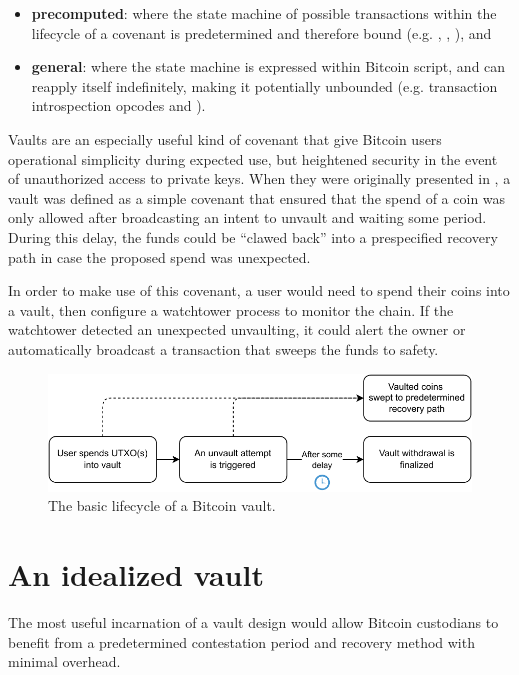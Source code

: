 \documentclass[10pt]{article}
\begin{document}
\begin{itemize}
  \item \textbf{precomputed}: where the state machine of possible transactions within the lifecycle
    of a covenant is predetermined and therefore bound (e.g.  \cite{CTV},
     \cite{APO},  \cite{OPTX}), and

  \item \textbf{general}: where the state machine is expressed within Bitcoin script,
    and can reapply itself indefinitely, making it potentially unbounded (e.g.
    transaction introspection opcodes and  \cite{ElementsScript}).

\end{itemize}

Vaults are an especially useful kind of covenant that give Bitcoin users operational
simplicity during expected use, but heightened security in the event of unauthorized
access to private keys. When they were originally presented in \cite{Cov}, a vault was
defined as a simple covenant that ensured that the spend of a coin was only allowed
after broadcasting an intent to unvault and waiting some period. During this delay, the
funds could be ``clawed back'' into a prespecified recovery path in case the proposed
spend was unexpected.

In order to make use of this covenant, a user would need to spend their coins into a
vault, then configure a watchtower process to monitor the chain. If the watchtower
detected an unexpected unvaulting, it could alert the owner or automatically broadcast
a transaction that sweeps the funds to safety.
 
\begin{figure}[H]
  \includegraphics[width=0.7\linewidth]{basic.pdf}
  \centering
  \caption{The basic lifecycle of a Bitcoin vault.}
\end{figure}


\section*{An idealized vault}

The most useful incarnation of a vault design would allow Bitcoin custodians to
benefit from a predetermined contestation period and recovery method with minimal
overhead. 
\end{document}

